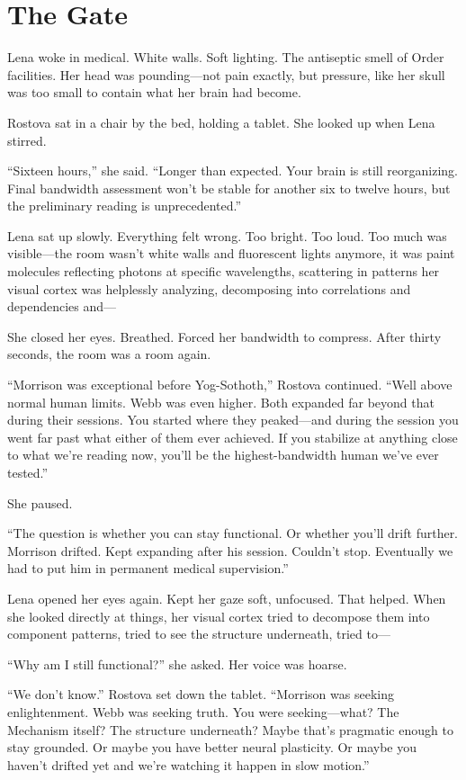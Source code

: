 \chapter{The Gate}

Lena woke in medical. White walls. Soft lighting. The antiseptic smell of Order facilities. Her head was pounding—not pain exactly, but pressure, like her skull was too small to contain what her brain had become.

Rostova sat in a chair by the bed, holding a tablet. She looked up when Lena stirred.

``Sixteen hours,'' she said. ``Longer than expected. Your brain is still reorganizing. Final bandwidth assessment won't be stable for another six to twelve hours, but the preliminary reading is unprecedented.''

Lena sat up slowly. Everything felt wrong. Too bright. Too loud. Too much was visible—the room wasn't white walls and fluorescent lights anymore, it was paint molecules reflecting photons at specific wavelengths, scattering in patterns her visual cortex was helplessly analyzing, decomposing into correlations and dependencies and—

She closed her eyes. Breathed. Forced her bandwidth to compress. After thirty seconds, the room was a room again.

``Morrison was exceptional before Yog-Sothoth,'' Rostova continued. ``Well above normal human limits. Webb was even higher. Both expanded far beyond that during their sessions. You started where they peaked—and during the session you went far past what either of them ever achieved. If you stabilize at anything close to what we're reading now, you'll be the highest-bandwidth human we've ever tested.''

She paused.

``The question is whether you can stay functional. Or whether you'll drift further. Morrison drifted. Kept expanding after his session. Couldn't stop. Eventually we had to put him in permanent medical supervision.''

Lena opened her eyes again. Kept her gaze soft, unfocused. That helped. When she looked directly at things, her visual cortex tried to decompose them into component patterns, tried to see the structure underneath, tried to—

``Why am I still functional?'' she asked. Her voice was hoarse.

``We don't know.'' Rostova set down the tablet. ``Morrison was seeking enlightenment. Webb was seeking truth. You were seeking—what? The Mechanism itself? The structure underneath? Maybe that's pragmatic enough to stay grounded. Or maybe you have better neural plasticity. Or maybe you haven't drifted yet and we're watching it happen in slow motion.''

